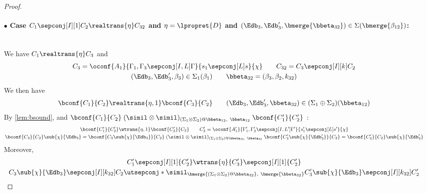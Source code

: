 \begin{proof}
  \paragraph{$\bullet$ Case 
  $C_1 \sepconj[I][1] C_2 \realtrans{\eta} C_{32}$
  and
  $\eta=\lpropret{D}$
  and
  $(\Edb_3,\Edb_3',\bmerge{\bbeta_{32}}) \in \Sigma(\bmerge{\beta_{12}})$:}~\\
  We have
  $C_1 \realtrans{\eta} C_3$ and
  \begin{gather*}
    C_3 = \oconf{A_1}{\Gamma_1,\Gamma_3\sepconj[I,L]\Gamma}{s_1\sepconj[L] s}{\chi}
    \qquad
    C_{32} = C_3\sepconj[I][k] C_2
    \\
    (\Edb_3,\Edb_3',\beta_3) \in \Sigma_1(\beta_1)
    \qquad
    \bbeta_{32}=(\beta_3,\beta_2, k_{32})
  \end{gather*}
  We then have
  \begin{gather*}
    \bconf{C_1}{C_2} \realtrans{\eta,1} \bconf{C_3}{C_2}
    \qquad
    (\Edb_3,\Edb_3',\bbeta_{32}) \in (\Sigma_1\oplus\Sigma_2)(\bbeta_{12})
  \end{gather*}
  By \cref{lem:bsound}, and $\bconf{C_1}{C_2} \mathrel{(\simil \otimes \simil)_{(\Sigma_1\otimes\Sigma_2)@\bbeta_{12},~\bbeta_{12}}} \bconf{C_1'}{C_2'}$ :
  \begin{gather*}
    \bconf{C_1'}{C_2'} \wtrans{\eta,1} \bconf{C_3'}{C_2}
    \qquad
    C_3' = \oconf{A_1'}{\Gamma_1',\Gamma_3'\sepconj[I,L']\Gamma'}{s_1'\sepconj[L] s'}{\chi}
    \\
    \bconf{C_3}{C_2}\sub{\chi}{\Edb_3}=
    \bconf{C_3\sub{\chi}{\Edb_3}}{C_2}
    \mathrel{(\simil \otimes \simil)_{(\Sigma_1\otimes\Sigma_2)@\bbeta_{32},~\bbeta_{32}}}
    \bconf{C_3'\sub{\chi}{\Edb_3'}}{C_2}=
    \bconf{C_3'}{C_2}\sub{\chi}{\Edb_3'}
  \end{gather*}
  Moreover,
  \begin{gather*}
    {C_1'}\sepconj[I][1]{C_2'} \wtrans{\eta} {C_3'}\sepconj[I][1]{C_2'}
    \\
    C_3\sub{\chi}{\Edb_3} \sepconj[I][k_{32}] C_2
    \utsepconj*{\simil}_{\bmerge{(\Sigma_1\otimes\Sigma_2)@\bbeta_{32}},~\bmerge{\bbeta_{32}}}
    C_3'\sub{\chi}{\Edb_3} \sepconj[I][k_{32}] C_2'
  \end{gather*}




\end{proof}
